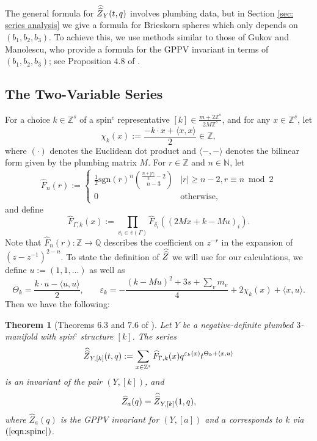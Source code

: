 \documentclass[11pt,letterpaper]{amsart}
\newtheorem{theorem}{Theorem}[section]
\theoremstyle{definition}
\theoremstyle{plain}
\newcommand{\Z}{\mathbb{Z}}
\newcommand{\Q}{\mathbb{Q}}
\newcommand{\Zhat}{\widehat{Z}}
\newcommand{\Zhathat}{\widehat{\vphantom{\rule{5pt}{10pt}}\smash{\widehat{Z}}\,}\!}
\numberwithin{equation}{section}
\theoremstyle{example}
\begin{document}
The general formula for $\Zhathat_{Y}(t,q)$ involves plumbing data, but in Section \ref{sec: series analysis} we give a formula for Brieskorn spheres which only depends on $(b_{1},b_{2},b_{3})$. To achieve this, we use methods similar to those of Gukov and Manolescu, who provide a formula for the GPPV invariant in terms of $(b_{1},b_{2},b_{3})$; see Proposition $4.8$ of \cite{gukovmanolescu}.

\subsection{The Two-Variable Series}
For a choice $k \in \Z^{s}$ of a spin$^{c}$ representative $\displaystyle{[k] \in \frac{m+2\Z^{s}}{2M\Z^{s}}}$, and for any  $x \in \Z^{s}$, let \[\chi_{k}(x):=\frac{-k \cdot x + \langle x, x \rangle}{2} \in \Z,\] where $(\cdot)$ denotes the Euclidean dot product and $\langle -,- \rangle$ denotes the bilinear form given by the plumbing matrix $M$. For $r \in \Z$ and $n \in \mathbb{N}$, let \begin{equation}\label{eq: fhat} \widehat{F}_{n}(r):=\begin{cases} \frac{1}{2}\text{sgn}(r)^{n}\binom{\frac{n+|r|}{2}-2}{n-3} & |r| \geq n-2,r\equiv{n}\bmod{2} \\ 0 & \text{otherwise}, \end{cases}\end{equation} and define \[\widehat{F}_{\Gamma,k}(x):=\prod_{v_{i} \in v(\Gamma)}\widehat{F}_{\delta_{i}}((2Mx+k-Mu)_{i}).\] Note that $\widehat{F}_{n}(r):\Z\to \Q$ describes the coefficient on $z^{-r}$ in the expansion of $(z-z^{-1})^{2-n}$. To state the definition of $\Zhathat$ we will use for our calculations, we define $u:=(1,1,\ldots )$ as well as
\[\Theta_{k}=\frac{k \cdot u - \langle u, u \rangle}{2}\text{,} \qquad \varepsilon_{k}=-\frac{(k-Mu)^{2}+3s+\sum_{v}m_{v}}{4}+2\chi_{k}(x)+\langle x, u \rangle.\]
Then we have the following: 
\begin{theorem}[Theorems $6.3$ and $7.6$ of \cite{latticecohomology}]\label{thm: zhathat def} Let $Y$ be a negative-definite plumbed $3$-manifold with spin$^{c}$ structure $[k]$. The series \begin{equation}\label{zhathat formula} \Zhathat_{Y,[k]}(t,q):=\sum_{x \in \Z^{s}}\widehat{F}_{\Gamma,k}(x)q^{\varepsilon_{k}(x)}t^{\Theta_{k}+\langle x, u \rangle}\end{equation} is an invariant of the pair $(Y, [k])$, and \[\Zhat_{a}(q)=\Zhathat_{Y,[k]}(1,q),\] where $\widehat{Z}_{a}(q)$ is the GPPV invariant for $(Y, [a])$ and $a$ corresponds to $k$ via $(\ref{eqn:spinc})$.
\end{theorem}
\end{document}
